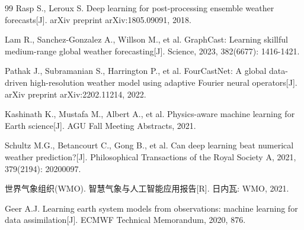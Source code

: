 \documentclass{article}
\begin{document}
\begin{thebibliography}{99}
Rasp S., Leroux S. Deep learning for post-processing ensemble weather forecasts[J]. arXiv preprint arXiv:1805.09091, 2018.

Lam R., Sanchez-Gonzalez A., Willson M., et al. GraphCast: Learning skillful medium-range global weather forecasting[J]. Science, 2023, 382(6677): 1416-1421.

Pathak J., Subramanian S., Harrington P., et al. FourCastNet: A global data-driven high-resolution weather model using adaptive Fourier neural operators[J]. arXiv preprint arXiv:2202.11214, 2022.

Kashinath K., Mustafa M., Albert A., et al. Physics-aware machine learning for Earth science[J]. AGU Fall Meeting Abstracts, 2021.

Schultz M.G., Betancourt C., Gong B., et al. Can deep learning beat numerical weather prediction?[J]. Philosophical Transactions of the Royal Society A, 2021, 379(2194): 20200097.

世界气象组织(WMO). 智慧气象与人工智能应用报告[R]. 日内瓦: WMO, 2021.

Geer A.J. Learning earth system models from observations: machine learning for data assimilation[J]. ECMWF Technical Memorandum, 2020, 876.

\end{thebibliography}
\end{document}
